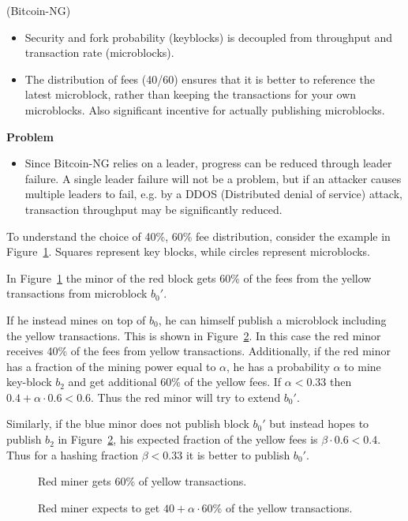 \begin{note} 
	(Bitcoin-NG)\newline
	
	
	\begin{itemize}
		\item Security and fork probability (keyblocks) is decoupled from throughput and transaction rate (microblocks).
		\item The distribution of fees (40/60) ensures that it is better to reference the latest microblock, rather than keeping the transactions for your own microblocks. Also significant incentive for actually publishing microblocks.
	\end{itemize}

\noindent	
\textbf{Problem}
	\begin{itemize}
		\item Since Bitcoin-NG relies on a leader, progress can be reduced through leader failure. A single leader failure will not be a problem, but if an attacker causes multiple leaders to fail, e.g. by a DDOS (Distributed denial of service) attack, transaction throughput may be significantly reduced.
	\end{itemize}
\end{note}

\begin{example}
To understand the choice of 40\%, 60\% fee distribution, consider the example in Figure~\ref{fig:bitng-1}. Squares represent key blocks, while circles represent microblocks. 

In Figure~\ref{fig:bitng-1} the minor of the red block gets 60\% of the fees from the yellow transactions from microblock $b_0'$.

If he instead mines on top of $b_0$, he can himself publish a microblock including the yellow transactions. This is shown in Figure~\ref{fig:bitng-2}.
In this case the red minor receives 40\% of the fees from yellow transactions. 
Additionally, if the red minor has a fraction of the mining power equal to $\alpha$, he has a probability $\alpha$ to mine key-block $b_2$ and get additional 60\% of the yellow fees. 
If $\alpha<0.33$ then $0.4+\alpha\cdot 0.6 < 0.6$. Thus the red minor will try to extend $b_0'$.

Similarly, if the blue minor does not publish block $b_0'$ but instead hopes to publish $b_2$ in Figure~\ref{fig:bitng-2}, his expected fraction of the yellow fees is $\beta\cdot 0.6 <0.4$. Thus for a hashing fraction $\beta<0.33$ it is better to publish $b_0'$.
	\begin{figure}[h]
		\centering
		
		\caption{Red miner gets 60\% of yellow transactions.}
		\label{fig:bitng-1}
	\end{figure}
	\begin{figure}[h]
		\centering
		
		\caption{Red miner expects to get $40+\alpha\cdot 60$\% of the yellow transactions.}
		\label{fig:bitng-2}
	\end{figure}

	
\end{example}



